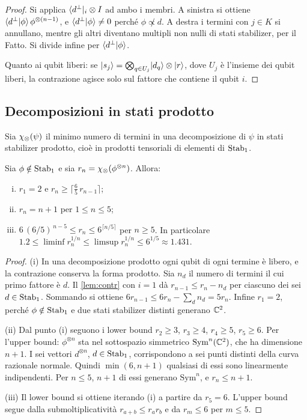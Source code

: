 \begin{proof}
Si applica $\langle d^\perp\rvert_i\otimes I$ ad ambo i membri. A sinistra si ottiene $\langle d^\perp\vert \phi\rangle\,\phi^{\otimes(n-1)}$, e $\langle d^\perp\vert \phi\rangle\neq0$ perché $\phi\not\propto d$. A destra i termini con $j\in K$ si annullano, mentre gli altri diventano multipli non nulli di stati stabilizer, per il Fatto. Si divide infine per $\langle d^\perp\vert \phi\rangle$.

Quanto ai qubit liberi: se $\lvert s_j\rangle=\bigotimes_{q\in U_j}\lvert d_q\rangle\otimes\lvert r\rangle$, dove $U_j$ è l'insieme dei qubit liberi, la contrazione agisce solo sul fattore che contiene il qubit $i$.
\end{proof}

\subsection{Decomposizioni in stati prodotto}

Sia $\chi_{\otimes}(\psi)$ il minimo numero di termini in una decomposizione di $\psi$ in stati stabilizer prodotto, cioè in prodotti tensoriali di elementi di $\mathrm{Stab}_1$.

\begin{theorem}\label{thm:prod}
Sia $\phi\notin\mathrm{Stab}_1$ e sia $r_n=\chi_{\otimes}(\phi^{\otimes n})$. Allora:
\begin{enumerate}[(i),leftmargin=2em]
\item $r_1=2$ e $r_n\ge\lceil\tfrac65\,r_{n-1}\rceil$;
\item $r_n=n+1$ per $1\le n\le 5$;
\item $6\,(6/5)^{\,n-5}\le r_n\le 6^{\lceil n/5\rceil}$ per $n\ge5$. In particolare $1.2\le\liminf r_n^{1/n}\le\limsup r_n^{1/n}\le 6^{1/5}\approx1.431$.
\end{enumerate}
\end{theorem}

\begin{proof}
(i) In una decomposizione prodotto ogni qubit di ogni termine è libero, e la contrazione conserva la forma prodotto. Sia $n_d$ il numero di termini il cui primo fattore è $d$. Il \cref{lem:contr} con $i=1$ dà $r_{n-1}\le r_n-n_d$ per ciascuno dei sei $d\in\mathrm{Stab}_1$. Sommando si ottiene $6r_{n-1}\le 6r_n-\sum_dn_d=5r_n$. Infine $r_1=2$, perché $\phi\notin\mathrm{Stab}_1$ e due stati stabilizer distinti generano $\mathbb C^2$.

(ii) Dal punto (i) seguono i lower bound $r_2\ge3$, $r_3\ge4$, $r_4\ge5$, $r_5\ge6$. Per l'upper bound: $\phi^{\otimes n}$ sta nel sottospazio simmetrico $\mathrm{Sym}^n(\mathbb C^2)$, che ha dimensione $n+1$. I sei vettori $d^{\otimes n}$, $d\in\mathrm{Stab}_1$, corrispondono a sei punti distinti della curva razionale normale. Quindi $\min(6,n+1)$ qualsiasi di essi sono linearmente indipendenti. Per $n\le5$, $n+1$ di essi generano $\mathrm{Sym}^n$, e $r_n\le n+1$.

(iii) Il lower bound si ottiene iterando (i) a partire da $r_5=6$. L'upper bound segue dalla submoltiplicatività $r_{a+b}\le r_ar_b$ e da $r_m\le6$ per $m\le5$.
\end{proof}


